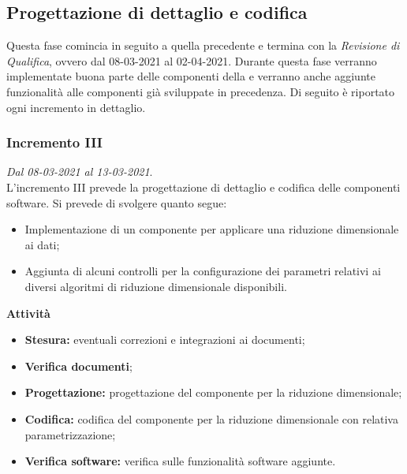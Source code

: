 \subsection{Progettazione di dettaglio e codifica}
Questa fase comincia in seguito a quella precedente e termina con la \textit{Revisione di Qualifica}, ovvero dal 08-03-2021 al 02-04-2021. Durante questa fase verranno implementate buona parte delle componenti della  e verranno anche aggiunte funzionalità alle componenti già sviluppate in precedenza.
Di seguito è riportato ogni incremento in dettaglio.

\subsubsection{Incremento III}
\textit{Dal 08-03-2021 al 13-03-2021}.\\
L'incremento III prevede la progettazione di dettaglio e codifica delle componenti software. Si prevede di svolgere quanto segue:
\begin{itemize}
\item Implementazione di un componente per applicare una riduzione dimensionale ai dati;
\item Aggiunta di alcuni controlli per la configurazione dei parametri relativi ai diversi algoritmi di riduzione dimensionale disponibili.
\end{itemize}
\textbf{Attività}
\begin{itemize}
\item \textbf{Stesura:} eventuali correzioni e integrazioni ai documenti;
\item \textbf{Verifica documenti};
\item \textbf{Progettazione:} progettazione del componente per la riduzione dimensionale;
\item \textbf{Codifica:} codifica del componente per la riduzione dimensionale con relativa parametrizzazione;
\item \textbf{Verifica software:} verifica sulle funzionalità software aggiunte.
\end{itemize}
